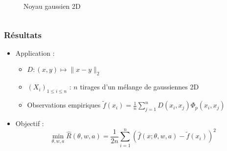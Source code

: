 \documentclass[c]{beamer}
\begin{document}
\begin{frame}
\begin{columns}
\begin{column}{.5\textwidth}
\begin{figure}
              \caption{Noyau gaussien 2D}
          \end{figure}
      \end{column}
  \end{columns}

\end{frame}

\begin{frame}
    \frametitle{Résultats}

    \begin{itemize}
        \item Application :
            \begin{itemize}
                \item $D : (x, y) \mapsto \|x - y\|_2$
                \item $(X_i)_{1 \leq i \leq n}$ : $n$ tirages d'un mélange de gaussiennes 2D
                \item Observations empiriques $\tilde{f}(x_i) = \frac{1}{n} \sum_{j=1}^n D(x_i, x_j) \Phi_p(x_i, x_j)$
            \end{itemize}
        \item Objectif :
            \[
                \min_{\theta, w, a} \hat{R}(\theta, w, a)
                = \frac{1}{2n} \sum_{i= 1}^n \left( \hat{f}(x; \theta, w, a) - \tilde{f}(x_i) \right)^2
            \]
    \end{itemize}
\end{frame}
\end{document}
